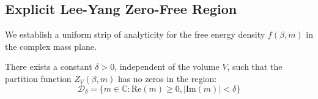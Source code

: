 \subsection{Explicit Lee-Yang Zero-Free Region}
\label{sec:lee-yang-explicit}

We establish a uniform strip of analyticity for the free energy density $f(\beta, m)$ in the complex mass plane.

\begin{theorem}
There exists a constant $\delta > 0$, independent of the volume $V$, such that the partition function $Z_V(\beta, m)$ has no zeros in the region:
\begin{equation}
\mathcal{D}_\delta = \{ m \in \mathbb{C} : \mathrm{Re}(m) \ge 0, |\mathrm{Im}(m)| < \delta \}
\end{equation}
\end{theorem}

